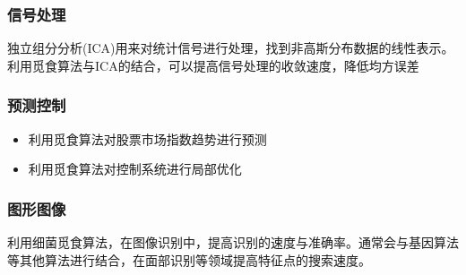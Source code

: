 \documentclass{beamer}
\begin{document}
\begin{frame}
\frametitle{信号处理}
独立组分分析(ICA)用来对统计信号进行处理，找到非高斯分布数据的线性表示。利用觅食算法与ICA的结合，可以提高信号处理的收敛速度，降低均方误差
\end{frame}

\begin{frame}
\frametitle{预测控制}
\begin{itemize}
\item 利用觅食算法对股票市场指数趋势进行预测
\item 利用觅食算法对控制系统进行局部优化
\end{itemize}
\end{frame}

\begin{frame}
\frametitle{图形图像}
利用细菌觅食算法，在图像识别中，提高识别的速度与准确率。通常会与基因算法等其他算法进行结合，在面部识别等领域提高特征点的搜索速度。
\end{frame}
\end{document}
